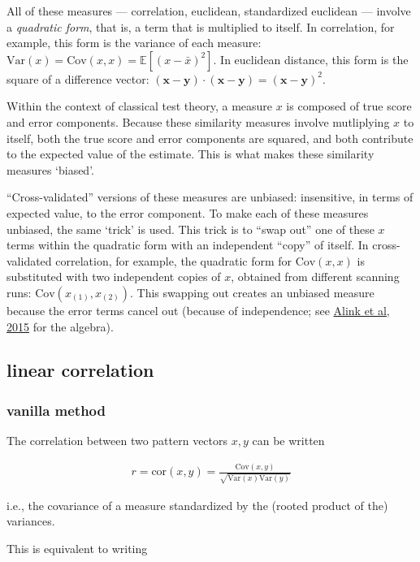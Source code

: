 \documentclass{article}\usepackage[]{graphicx}\usepackage[]{color}
\begin{document}
All of these measures --- correlation, euclidean, standardized euclidean --- involve a \textit{quadratic form}, that is, a term that is multiplied to itself.
In correlation, for example, this form is the variance of each measure: $\text{Var}(x) = \text{Cov}(x, x) = \mathbb{E}[(x - \bar{x})^2]$.
In euclidean distance, this form is the square of a difference vector: $(\mathbf{x} - \mathbf{y}) \cdot (\mathbf{x} - \mathbf{y}) = (\mathbf{x} - \mathbf{y})^2$.

Within the context of classical test theory, a measure $x$ is composed of true score and error components.
Because these similarity measures involve mutliplying $x$ to itself, both the true score and error components are squared, and both contribute to the expected value of the estimate.
This is what makes these similarity measures `biased'.

``Cross-validated'' versions of these measures are unbiased: insensitive, in terms of expected value, to the error component.
To make each of these measures unbiased, the same `trick' is used.
This trick is to ``swap out'' one of these $x$ terms within the quadratic form with an independent ``copy'' of itself.
In cross-validated correlation, for example, the quadratic form for $\text{Cov}(x, x)$ is substituted with two independent copies of $x$, obtained from different scanning runs: $\text{Cov}(x_{(1)}, x_{(2)})$.
This swapping out creates an unbiased measure because the error terms cancel out (because of independence; see \href{https://www.biorxiv.org/content/10.1101/032391v2}{Alink et al, 2015} for the algebra).


\subsection*{linear correlation}

\subsubsection*{vanilla method}

The correlation between two pattern vectors $x, y$ can be written

\begin{align*}
  r = \text{cor}(x, y) = \frac
  {\text{Cov}(x, y)}
  {\sqrt{\text{Var}(x)\text{Var}(y)}}
\end{align*}

i.e., the covariance of a measure standardized by the (rooted product of the) variances.

This is equivalent to writing
\end{document}
